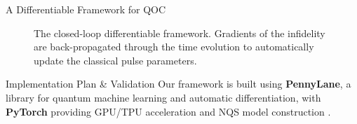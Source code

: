 \documentclass[final]{beamer}
\newlength{\colwidth}
\begin{document}
\begin{frame}[t]
\begin{columns}[t]
\begin{column}{\colwidth}
\begin{alertblock}{A Differentiable Framework for QOC}
    \begin{figure}
        \centering
        \caption{The closed-loop differentiable framework. Gradients of the infidelity are back-propagated through the time evolution to automatically update the classical pulse parameters.}
    \end{figure}    
  \end{alertblock}

\begin{block}{Implementation Plan \& Validation}
    Our framework is built using \textbf{PennyLane}, a library for quantum machine learning and automatic differentiation, with \textbf{PyTorch} providing GPU/TPU acceleration and NQS model construction \cite{Bergholm2018, Paszke2019, Berni2025Brief}.
    

\end{block}
\end{column}
\end{columns}
\end{frame}
\end{document}

